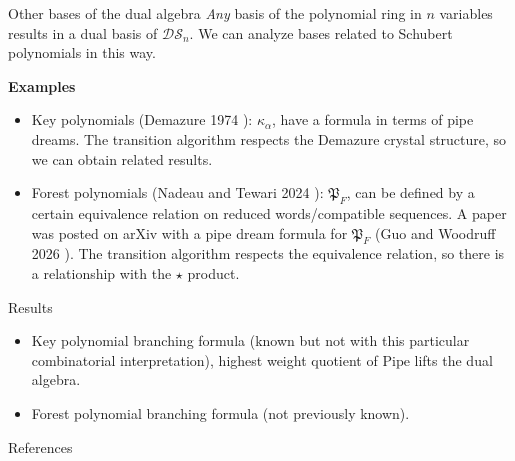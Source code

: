 \documentclass[aspectratio=169]{beamer}
\newcommand{\dcoma}{\mathcal{DS}}
\newcommand{\Forest}[1]{\mathfrak{P}_{#1}}
\newcommand{\RC}{\mathrm{Pipe}}
\begin{document}


\begin{frame}{Other bases of the dual algebra}
  \emph{Any} basis of the polynomial ring in $n$ variables results in a dual basis of $\dcoma_n$. We can analyze bases related to Schubert polynomials in this way.

  \textbf{Examples}
\begin{itemize}
\item Key polynomials (Demazure 1974 \cite{demazure1974key}): $\kappa_\alpha$, have a formula in terms of pipe dreams. The transition algorithm respects the Demazure crystal structure, so we can obtain related results.
\item Forest polynomials (Nadeau and Tewari 2024 \cite{nadeau2024forest}): $\Forest{F}$, can be defined by a certain equivalence relation on reduced words/compatible sequences. 
A paper was posted on arXiv with a pipe dream formula for $\Forest{F}$ (Guo and Woodruff 2026 \cite{guo2026forest}). The transition algorithm respects the equivalence relation, so there is a relationship with the $\star$ product.
\end{itemize}
\end{frame}

\begin{frame}{Results}
\begin{theorem}[S, $2026+$]
    \begin{itemize}
    \item Key polynomial branching formula (known but not with this particular combinatorial interpretation), highest weight quotient of $\RC$ lifts the dual algebra.
    \item Forest polynomial branching formula (not previously known).
    \end{itemize}
  \end{theorem}
\end{frame}

\begin{frame}[allowframebreaks]{References}
  
  
\end{frame}
\end{document}
